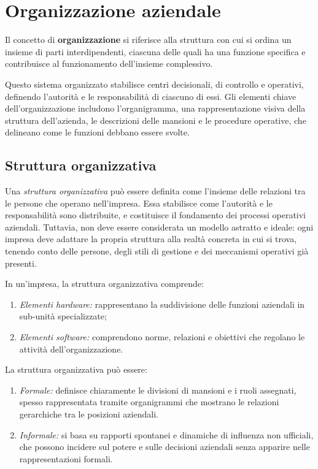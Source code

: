 \chapter{Organizzazione aziendale}
\begin{redbar}
Il concetto di \textbf{organizzazione} si riferisce alla struttura con cui si ordina un insieme di parti interdipendenti, ciascuna delle quali ha una funzione specifica e contribuisce al funzionamento dell’insieme complessivo.     
\end{redbar}

Questo sistema organizzato stabilisce centri decisionali, di controllo e operativi, definendo l’autorità e le responsabilità di ciascuno di essi. Gli elementi chiave dell’organizzazione includono l’organigramma, una rappresentazione visiva della struttura dell’azienda, le descrizioni delle mansioni e le procedure operative, che delineano come le funzioni debbano essere svolte.

\section{Struttura organizzativa}
Una \textit{struttura organizzativa} può essere definita come l’insieme delle relazioni tra le persone che operano nell’impresa. Essa stabilisce come l’autorità e le responsabilità sono distribuite, e costituisce il fondamento dei processi operativi aziendali. Tuttavia, non deve essere considerata un modello astratto e ideale: ogni impresa deve adattare la propria struttura alla realtà concreta in cui si trova, tenendo conto delle persone, degli stili di gestione e dei meccanismi operativi già presenti.

In un’impresa, la struttura organizzativa comprende:
\begin{enumerate}
    \item \textit{Elementi hardware:} rappresentano la suddivisione delle funzioni aziendali in sub-unità specializzate;
    \item \textit{Elementi software:} comprendono norme, relazioni e obiettivi che regolano le attività dell’organizzazione.
\end{enumerate}

La struttura organizzativa può essere:
\begin{enumerate}
    \item \textit{Formale:} definisce chiaramente le divisioni di mansioni e i ruoli assegnati, spesso rappresentata tramite organigrammi che mostrano le relazioni gerarchiche tra le posizioni aziendali. 
    \item \textit{Informale:} si basa su rapporti spontanei e dinamiche di influenza non ufficiali, che possono incidere sul potere e sulle decisioni aziendali senza apparire nelle rappresentazioni formali.
\end{enumerate}


